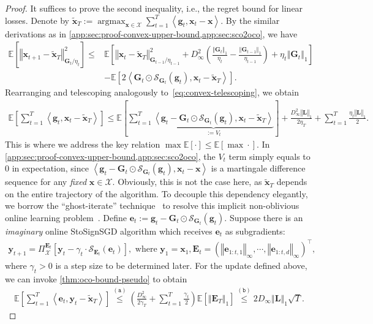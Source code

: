 \documentclass{article}
\def \y {\mathbf{y}}
\def \E {\mathbb{E}}
\def \x {\mathbf{x}}
\def \g {\mathbf{g}}
\def \xt {\widetilde{\x}}
\def \SS {\mathcal{S}}
\def \Gb {\mathbf{G}}
\def \Lb {\mathbf{L}}
\def \e {\mathbf{e}}
\def \EB {\mathbf{E}}
\def \X {\mathcal{X}}
\newcommand{\inner}[2]{\left\langle #1, #2 \right\rangle}
\DeclareMathOperator*{\argmax}{argmax}
\newcommand{\norm}[1]{\left\Vert#1\right\Vert}
\newcommand{\sqbrac}[1]{\left[#1\right]}
\newcommand{\brac}[1]{\left(#1\right)}
\begin{document}
\begin{proof}
    It suffices to prove the second inequality, i.e., the regret bound for linear losses. Denote by $\xt_T:=\argmax_{\x\in\X}\sum_{t=1}^T\inner{\g_t}{\x_t-\x}$. By the similar derivations as in \cref{app:sec:proof-convex-upper-bound,app:sec:sco2oco}, we have
    \begin{align*}
    \E\sqbrac{\norm{\x_{t+1}-\xt_T}^2_{\Gb_t/\eta_t}}\le&\E\sqbrac{\norm{\x_{t}-\xt_T}^2_{\Gb_{t-1}/\eta_{t-1}}+D_\infty^2\brac{\frac{\norm{\Gb_t}_1}{\eta_t}-\frac{\norm{\Gb_{t-1}}_1}{\eta_{t-1}}}+\eta_t\norm{\Gb_t}_1}\\&-\E\sqbrac{2\inner{\Gb_t\odot\SS_{\Gb_t}(\g_t)}{\x_{t}-\xt_T}}.
\end{align*}
Rearranging and telescoping analogously to~\eqref{eq:convex-telescoping}, we obtain
\begin{align*}
    \E\sqbrac{\sum_{t=1}^T\inner{\g_t}{\x_{t}-\xt_T}}\le\E\sqbrac{\sum_{t=1}^T\underbrace{\inner{\g_t-\Gb_t\odot\SS_{\Gb_t}(\g_t)}{\x_{t}-\xt_T}}_{:=V_t}}+\frac{D_\infty^2\norm{\Lb}_1}{2\eta_T}+\sum_{t=1}^T\frac{\eta_t\norm{\Lb}_1}{2}.
\end{align*}
This is where we address the key relation $\max\E[\cdot]\le\E[\max\cdot]$. In \cref{app:sec:proof-convex-upper-bound,app:sec:sco2oco}, the $V_t$ term simply equals to $0$ in expectation, since $\inner{\g_t-\Gb_t\odot\SS_{\Gb_t}(\g_t)}{\x_{t}-\x}$ is a martingale difference sequence for any \emph{fixed} $\x\in\X$. Obviously, this is not the case here, as $\xt_T$ depends on the entire trajectory of the algorithm. 
To decouple this dependency elegantly, we borrow the ``ghost-iterate'' technique~\citep{nemirovski2009robust,NeurIPS:2023:Zhang,yu24egdro,bai2025group,zhang2026gdro} to resolve this implicit non-oblivious online learning problem~\citep{cesa2006prediction}. 
Define $\e_t:=\g_t-\Gb_t\odot\SS_{\Gb_t}(\g_t)$. Suppose there is an \emph{imaginary} online StoSignSGD algorithm which receives $\e_t$ as subgradients:
\begin{align}\label{eq:ghost-iterate}
    \y_{t+1}=\Pi_\X^{\EB_t}\sqbrac{\y_t-\gamma_t\cdot\SS_{\EB_t}(\e_t)},\text{ where }\y_1=\x_1, \EB_t=(\norm{\e_{1:t,1}}_\infty,\cdots,\norm{\e_{1:t,d}}_\infty)^\top,
\end{align}
where $\gamma_t>0$ is a step size to be determined later. For the update defined above, we can invoke \cref{thm:oco-bound-pseudo} to obtain
\begin{align*}
    \E\sqbrac{\sum_{t=1}^T\inner{\e_t}{\y_t-\xt_T}}\overset{\mathtt{(a)}}{\le} \brac{\frac{D_\infty^2}{2\gamma_T}+\sum_{t=1}^T\frac{\gamma_t}{2}}\E\sqbrac{\norm{\EB_T}_1}\overset{\mathtt{(b)}}{\le}2D_\infty\norm{\Lb}_1\sqrt{T}.

\end{align*}
\end{proof}
\end{document}
